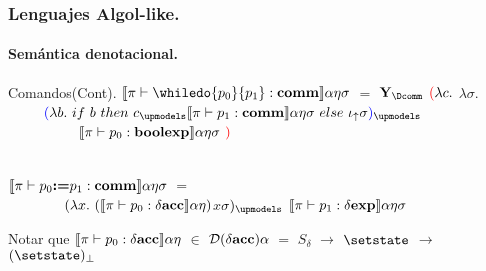 \documentclass{beamer} %
\begin{document}
\begin{frame}
\frametitle{Lenguajes Algol-like.}
\framesubtitle{Sem\'antica denotacional.}

\begin{block}{Comandos(Cont).}
$\denotalsem{\pi}{\whiledo{p_0}{p_1}:\comm}{\alpha}{\eta}{\sigma}$ $=$ $\Y_{\Dcomm}$ $\textcolor{red}{(}\lambda c .$ $\lambda \sigma .$\\
\ \ \ \ \ $\parentcolor{blue}{
\lambda b. \ if \ b \ then \ c_{\upmodels} \denotalsem{\pi}{p_1:\comm}{\alpha}{\eta}{\sigma} \ else \ \iotabot \sigma
}_{\upmodels}$ \\
\ \ \ \ \ \ \ \ \ \ $\llbracket \pi \vdash p_0:\textbf{boolexp} \rrbracket \alpha \eta \sigma$ $\textcolor{red}{)}$\\

\

$\llbracket \pi \vdash p_0 \textbf{:=} p_1:\textbf{comm} \rrbracket \alpha \eta \sigma$ $=$ \\
\ \ \ \ \ \ \ \ $(\lambda x. \ (\denotalsem{\pi}{p_0:\deltaacc}{\alpha}{\eta})$$x$${\sigma})_{\upmodels}$ 
$\llbracket \pi \vdash p_1:\delta \textbf{exp} \rrbracket \alpha \eta \sigma$ \\



\end{block}

\begin{block}{}
Notar que $\denotalsem{\pi}{p_0:\deltaacc}{\alpha}{\eta}$ $\in$ $\mathcal{D}(\delta \textbf{acc})\alpha$ $=$ $S_\delta$ $\rightarrow$ $\setstate$ $\rightarrow$ $(\setstate)_\bot$
\\
\end{block}
\end{frame}
\end{document}
